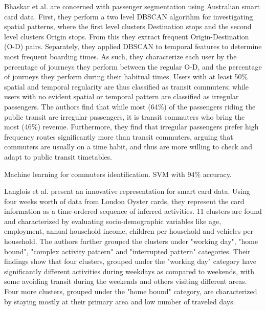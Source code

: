 \documentclass{article}
\begin{document}

Bhaskar et al. are concerned with passenger segmentation using Australian smart card data. First, they perform a two level DBSCAN algorithm for investigating spatial patterns, where the first level clusters Destination stops and the second level clusters Origin stops.  From this they extract frequent Origin-Destination (O-D) pairs. Separately, they applied DBSCAN to temporal features to determine most frequent boarding times.  As such, they characterize each user by the percentage of journeys they perform between the regular O-D, and the percentage of journeys they perform during their habitual times. Users with at least 50\% spatial and temporal regularity are thus classified as transit commuters; while users with no evident spatial or temporal pattern are classified as irregular passengers. The authors find that while most (64\%) of the passengers riding the public transit are irregular passengers, it is transit commuters who bring the most (46\%) revenue. Furthermore, they find that irregular passengers prefer high frequency routes significantly more than transit commuters, arguing that commuters are usually on a time habit, and thus are more willing to check and adapt to public transit timetables. \cite{bhaskar2015passenger}

Machine learning for commuters identification. SVM with 94\% accuracy. \cite{tu2016impact}

Langlois et al. present an innovative representation for smart card data. Using four weeks worth of data from London Oyster cards, they represent the card information as a time-ordered sequence of inferred activities.  11 clusters are found and characterized by evaluating socio-demographic variables like age, employment, annual household income, children per household and vehicles per household. The authors further grouped the clusters under "working day", "home bound", "complex activity pattern" and "interrupted pattern" categories. Their findings show that four clusters, grouped under the "working day" category have significantly different activities during weekdays as compared to weekends, with some avoiding transit during the weekends and others visiting different areas.  Four more clusters, grouped under the "home bound" category, are characterized by staying mostly at their primary area and low number of traveled days. \cite{langlois2016inferring}
\end{document}
